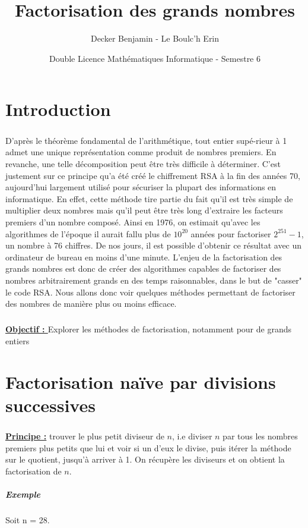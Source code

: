 \documentclass[11pt,a4paper]{article}
\begin{document}
	
	\title{Factorisation des grands nombres} 
	\author{Decker Benjamin - Le Boulc'h Erin}
	\date{Double Licence Mathématiques Informatique - Semestre 6}
	\maketitle
	\newpage
	
	\renewcommand*\contentsname{Sommaire}
	\tableofcontents
	
	\section{\LARGE{Introduction}}
	\subparagraph{}
	D'après le théorème fondamental de l'arithmétique, tout entier supé-rieur à 1 admet une unique représentation comme produit de nombres premiers. En revanche, une telle décomposition peut être très difficile à déterminer. C'est justement sur ce principe qu'a été créé le chiffrement RSA à la fin des années 70, aujourd'hui largement utilisé pour sécuriser la plupart des informations en informatique. En effet, cette méthode tire partie du fait qu'il est très simple de multiplier deux nombres mais qu'il peut être très long d'extraire les facteurs premiers d'un nombre composé. Ainsi en 1976, on estimait qu'avec les algorithmes de l'époque il aurait fallu plus de $10^{20}$ années pour factoriser $2^{251} - 1$, un nombre à 76 chiffres. De nos jours, il est possible d'obtenir ce résultat avec un ordinateur de bureau en moins d'une minute. L'enjeu de la factorisation des grands nombres est donc de créer des algorithmes capables de factoriser des nombres arbitrairement grands en des temps raisonnables, dans le but de "casser" le code RSA. Nous allons donc voir quelques méthodes permettant de factoriser des nombres de manière plus ou moins efficace.
	\subparagraph{}
	\textbf{\underline{Objectif : }}Explorer les méthodes de factorisation, notamment pour de grands entiers
	
	\section{\LARGE{Factorisation naïve par divisions successives}}
	\subparagraph{}
	\textbf{\underline{Principe :}} trouver le plus petit diviseur de  $n$, i.e diviser  $n$ par tous les nombres premiers plus petits que lui et voir si un d’eux le divise, puis itérer la méthode sur le quotient, jusqu'à arriver à 1. On récupère les diviseurs et on obtient la factorisation de $n$.
	
	\subparagraph{Exemple}
	Soit n = 28.
	
\end{document}
